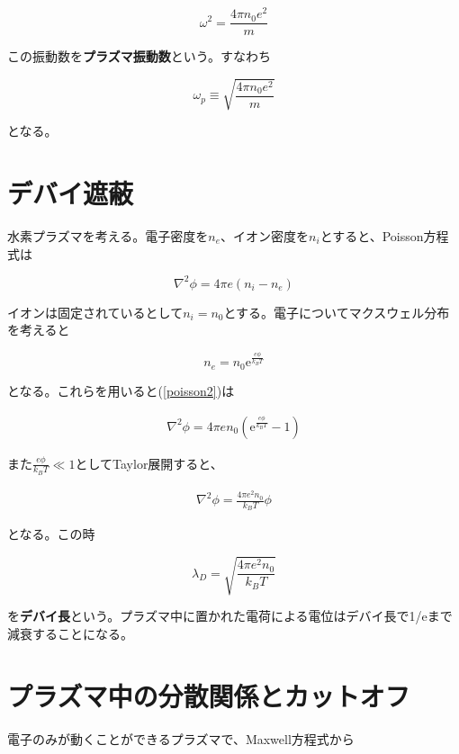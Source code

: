 \documentclass[18pt]{jsarticle}
\begin{document}
\begin{equation}
    \omega^2 = \frac{4\pi n_0 e^2}{m}
\end{equation}

この振動数を\textbf{プラズマ振動数}という。すなわち

\begin{equation}
    \omega_p \equiv \sqrt{\frac{4\pi n_0 e^2}{m}}
\end{equation}

となる。

\section{デバイ遮蔽}
\par 水素プラズマを考える。電子密度を$n_e$、イオン密度を$n_i$とすると、Poisson方程式は

\begin{equation}
    \label{poisson2}
    \nabla^2 \phi = 4\pi e(n_i-n_e)
\end{equation}

イオンは固定されているとして$n_i=n_0$とする。電子についてマクスウェル分布を考えると

\begin{equation}
    n_e = n_0 \mathrm{e}^{\frac{e\phi}{k_B T}}
\end{equation}

となる。これらを用いると(\ref{poisson2})は

\begin{eqnarray}
    \nabla^2 \phi = 4\pi en_0\left(\mathrm{e}^{\frac{e\phi}{k_B T}} -1 \right)
\end{eqnarray}

また$\frac{e\phi}{k_B T} \ll 1$としてTaylor展開すると、

\begin{eqnarray}
    \nabla^2 \phi = \frac{4\pi e^2 n_0}{k_B T}\phi
\end{eqnarray}

となる。この時

\begin{equation}
    \lambda_D = \sqrt{\frac{4\pi e^2 n_0}{k_B T}}
\end{equation}

を\textbf{デバイ長}という。プラズマ中に置かれた電荷による電位はデバイ長で1/eまで減衰することになる。

\section{プラズマ中の分散関係とカットオフ}
\par 電子のみが動くことができるプラズマで、Maxwell方程式から
\end{document}
